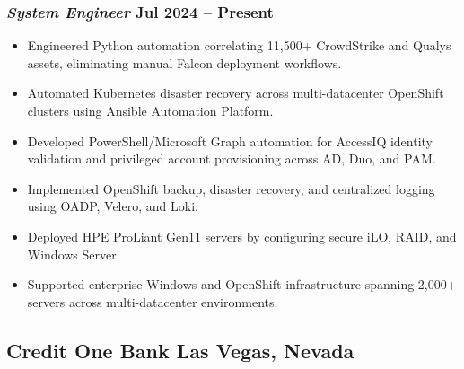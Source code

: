 \documentclass[11pt,letterpaper]{article}
\begin{document}
\subsubsection{\normalfont\textit{System Engineer} \hfill Jul 2024 -- Present}
\begin{itemize}
    \item Engineered Python automation correlating 11,500+ CrowdStrike and Qualys assets, eliminating manual Falcon deployment workflows.
    \item Automated Kubernetes disaster recovery across multi-datacenter OpenShift clusters using Ansible Automation Platform.
    \item Developed PowerShell/Microsoft Graph automation for AccessIQ identity validation and privileged account provisioning across AD, Duo, and PAM.
    \item Implemented OpenShift backup, disaster recovery, and centralized logging using OADP, Velero, and Loki.
    \item Deployed HPE ProLiant Gen11 servers by configuring secure iLO, RAID, and Windows Server.
    \item Supported enterprise Windows and OpenShift infrastructure spanning 2,000+ servers across multi-datacenter environments.
\end{itemize}

\subsection{Credit One Bank \hfill Las Vegas, Nevada}
\end{document}
